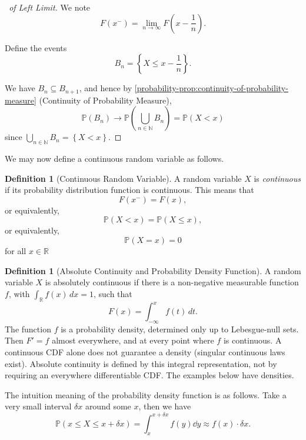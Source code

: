 \documentclass[11pt]{article}
\numberwithin{equation}{section}
\theoremstyle{definition}
\newtheorem{definition}[theorem]{Definition}
\theoremstyle{remark}
\newcommand{\pqty}[1]{\left(#1\right)}
\newcommand{\Bqty}[1]{\left\{#1\right\}}
\newcommand{\RR}{\mathbb R}
\newcommand{\NN}{\mathbb N}
\newcommand{\Prob}{\mathbb P}
\begin{document}
\begin{proof}[\proofname\ of Left Limit]\label{probability-proof-056}
    We note
    \[
        F\pqty{x^-} = \lim_{n \to \infty} F\pqty{x - \frac{1}{n}}.
    \]

    Define the events
    \[
        B_n = \Bqty{X \leq x - \frac{1}{n}}.
    \]

    We have \(B_n \subseteq B_{n + 1}\), and hence by \autoref{probability-prop:continuity-of-probability-measure} (Continuity of Probability Measure),
    \[
        \Prob\pqty{B_n} \to \Prob\pqty{\bigcup_{n \in \NN} B_n} = \Prob\pqty{X < x}
    \]
    since \(\bigcup_{n \in \NN} B_n = \Bqty{X < x}\).
\end{proof}

We may now define a continuous random variable as follows.

\begin{definition}[Continuous Random Variable]\label{probability-definition-043}
    \label{probability-def:continuous-random-variable}%
    A random variable \(X\) is \emph{continuous} if its probability distribution function is continuous. This means that
    \[
        F\pqty{x^-} = F\pqty{x},
    \]
    or equivalently,
    \[
        \Prob\pqty{X < x} = \Prob\pqty{X \leq x},
    \]
    or equivalently,
    \[
        \Prob\pqty{X = x} = 0
    \]
    for all \(x \in \RR\)
\end{definition}

\begin{definition}[Absolute Continuity and Probability Density Function]\label{probability-definition-044}
\label{probability-def:probability-density-function}
A random variable \(X\) is absolutely continuous if there is a non-negative
measurable function \(f\), with \(\int_{\RR}f(x)\,dx=1\), such that
\[F(x)=\int_{-\infty}^{x}f(t)\,dt.\]
The function \(f\) is a probability density, determined only up to Lebesgue-null
sets. Then \(F'=f\) almost everywhere, and at every point where \(f\) is continuous.
A continuous CDF alone does not guarantee a density (singular continuous laws
exist). Absolute continuity is defined by this integral representation, not by
requiring an everywhere differentiable CDF. The examples below have densities.
\end{definition}

The intuition meaning of the probability density function is as follows. Take a very small interval \(\delta x\) around some \(x\), then we have
\[
    \Prob\pqty{x \leq X \leq x + \delta x} = \int_{x}^{x + \delta x} f\pqty{y} \dd{y} \approx f\pqty{x} \cdot \delta x.
\]
\end{document}
